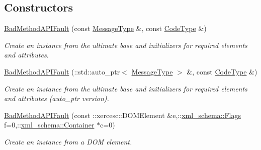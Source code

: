 \subsection*{Constructors}
\begin{DoxyCompactItemize}
\item 
\hypertarget{classopenstack_1_1xml_1_1BadMethodAPIFault_a9b34f9ff73e6991b5240029a39dd3ec6}{
\hyperlink{classopenstack_1_1xml_1_1BadMethodAPIFault_a9b34f9ff73e6991b5240029a39dd3ec6}{BadMethodAPIFault} (const \hyperlink{classopenstack_1_1xml_1_1CloudServersAPIFault_aff7b9d2067747fa033a0ea4408011af6}{MessageType} \&, const \hyperlink{classopenstack_1_1xml_1_1CloudServersAPIFault_aa9f350c9dba08ae375b2a61568551550}{CodeType} \&)}
\label{classopenstack_1_1xml_1_1BadMethodAPIFault_a9b34f9ff73e6991b5240029a39dd3ec6}

\begin{DoxyCompactList}\small\item\em Create an instance from the ultimate base and initializers for required elements and attributes. \item\end{DoxyCompactList}\item 
\hyperlink{classopenstack_1_1xml_1_1BadMethodAPIFault_a342eb7d95c52fc072444974a1eec0f91}{BadMethodAPIFault} (::std::auto\_\-ptr$<$ \hyperlink{classopenstack_1_1xml_1_1CloudServersAPIFault_aff7b9d2067747fa033a0ea4408011af6}{MessageType} $>$ \&, const \hyperlink{classopenstack_1_1xml_1_1CloudServersAPIFault_aa9f350c9dba08ae375b2a61568551550}{CodeType} \&)
\begin{DoxyCompactList}\small\item\em Create an instance from the ultimate base and initializers for required elements and attributes (auto\_\-ptr version). \item\end{DoxyCompactList}\item 
\hyperlink{classopenstack_1_1xml_1_1BadMethodAPIFault_a99dd0ddd90fc772d9fa5d8037193ec91}{BadMethodAPIFault} (const ::xercesc::DOMElement \&e,::\hyperlink{namespacexml__schema_affb4c227cbd9aa7453dd1dc5a1401943}{xml\_\-schema::Flags} f=0,::\hyperlink{namespacexml__schema_a333dea2213742aea47a37532dec4ec27}{xml\_\-schema::Container} $\ast$c=0)
\begin{DoxyCompactList}\small\item\em Create an instance from a DOM element. \item\end{DoxyCompactList}\item 

\end{DoxyCompactItemize}
